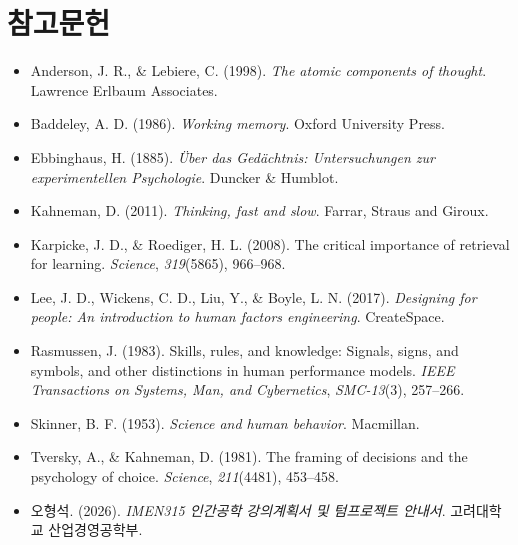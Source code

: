 \documentclass[a4paper,11pt]{article}
\begin{document}
\section*{참고문헌}
{\small{}
\begin{itemize}[leftmargin=1.5em, itemsep=2pt]
  \item Anderson, J. R., \& Lebiere, C. (1998). \textit{The atomic components of thought}.
    Lawrence Erlbaum Associates.
  \item Baddeley, A. D. (1986). \textit{Working memory}. Oxford University Press.
  \item Ebbinghaus, H. (1885). \textit{Über das Gedächtnis: Untersuchungen zur
    experimentellen Psychologie}. Duncker \& Humblot.
  \item Kahneman, D. (2011). \textit{Thinking, fast and slow}. Farrar, Straus and Giroux.
  \item Karpicke, J. D., \& Roediger, H. L. (2008). The critical importance of retrieval
    for learning. \textit{Science}, \textit{319}(5865), 966--968.
  \item Lee, J. D., Wickens, C. D., Liu, Y., \& Boyle, L. N. (2017).
    \textit{Designing for people: An introduction to human factors engineering}.
    CreateSpace.
  \item Rasmussen, J. (1983). Skills, rules, and knowledge: Signals, signs, and symbols,
    and other distinctions in human performance models.
    \textit{IEEE Transactions on Systems, Man, and Cybernetics}, \textit{SMC-13}(3),
    257--266.
  \item Skinner, B. F. (1953). \textit{Science and human behavior}. Macmillan.
  \item Tversky, A., \& Kahneman, D. (1981). The framing of decisions and the
    psychology of choice. \textit{Science}, \textit{211}(4481), 453--458.
  \item 오형석. (2026). \textit{IMEN315 인간공학 강의계획서 및 텀프로젝트 안내서}.
    고려대학교 산업경영공학부.
\end{itemize}
}
\end{document}
